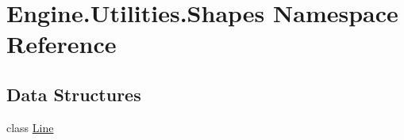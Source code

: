 \hypertarget{a00283}{}\section{Engine.\+Utilities.\+Shapes Namespace Reference}
\label{a00283}
\subsection*{Data Structures}
\begin{DoxyCompactItemize}
\item 
class \hyperlink{a00606}{Line}
\end{DoxyCompactItemize}
